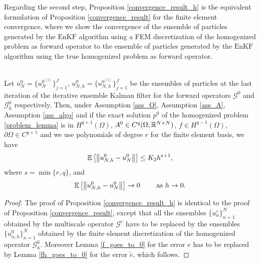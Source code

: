 \documentclass[10pt]{article}
\begin{document}
Regarding the second step, Proposition \ref{convergence_result_h} is the equivalent formulation of Proposition \ref{convergence_result} for the finite element convergence, where we show the convergence of the ensemble of particles generated by the $\mathrm{EnKF}$ algorithm using a FEM discretization of the homogenized problem as forward operator to the ensemble of particles generated by the $\mathrm{EnKF}$ algorithm using the true homogenized problem as forward operator.

\begin{proposition}
\label{convergence_result_h}
\leavevmode \\
Let $u_{N}^0 = \{ u_{N}^{0^{(j)}} \}_{j=1}^J$, $u_{N,h}^0 = \{ u_{N,h}^{0^{(j)}} \}_{j=1}^J$ be the ensembles of particles at the last iteration of the iterative ensemble Kalman filter for the forward operators $\mathcal{G}^0$ and $\mathcal{G}_h^0$ respectively. Then, under Assumption \ref{ass_O}, Assumption \ref{ass_A}, Assumption \ref{ass_algo} and if the exact solution $p^0$ of the homogenized problem \eqref{problem_lemma} is in $H^{q+1}(\Omega)$, $A^0 \in C^q(\Omega;\mathbb{R}^{N \times N})$, $f \in H^{q-1}(\Omega)$, $\partial \Omega \in C^{q+1}$ and we use polynomials of degree $r$ for the finite element basis, we have
\[ \mathbb{E} \left [ \left\|u_{N,h}^0 - u_N^0\right\| \right ] \le K_2 h^{s+1}, \]
where $s = \min \{ r, q \}$, and
\[ \mathbb{E} \left [ \left\|u_{N,h}^0 - u_N^0\right\| \right ] \to 0 \qquad \text{ as } h \to 0.  \]
\end{proposition}
\begin{proof}
The proof of Proposition \ref{convergence_result_h} is identical to the proof of Proposition \ref{convergence_result}, except that all the ensembles $\{ u_n^{\varepsilon} \}_{n=1}^N$ obtained by the multiscale operator $\mathcal{G}^{\varepsilon}$ have to be replaced by the ensembles $\{ u_{n,h}^0 \}_{n=1}^N$ obtained by the finite element discretization of the homogenized operator $\mathcal{G}^0_h$. Moreover Lemma \ref{f_goes_to_0} for the error $e$ has to be replaced by Lemma \ref{fh_goes_to_0} for the error $\tilde{e}$, which follows.
\end{proof}
\end{document}
